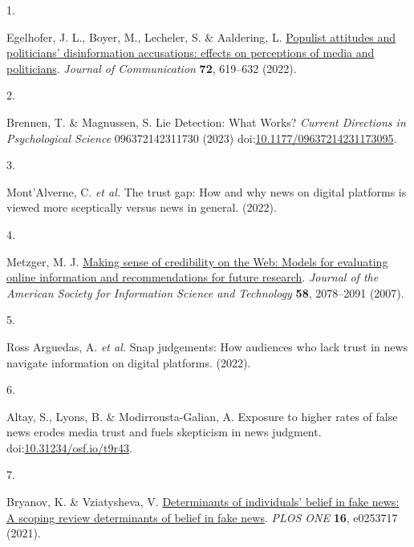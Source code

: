 \documentclass[
  doc,floatsintext]{apa6}
\newlength{\cslhangindent}
\newlength{\csllabelwidth}
\newenvironment{CSLReferences}[2] %
 {\begin{list}{}{%
  \setlength{\itemindent}{0pt}
  \setlength{\leftmargin}{0pt}
  \setlength{\parsep}{0pt}
  \ifodd #1
   \setlength{\leftmargin}{\cslhangindent}
   \setlength{\itemindent}{-1\cslhangindent}
  \fi
  \setlength{\itemsep}{#2\baselineskip}}}
 {\end{list}}
\newcommand{\CSLLeftMargin}[1]{\parbox[t]{\csllabelwidth}{\strut#1\strut}}
\newcommand{\CSLRightInline}[1]{\parbox[t]{\linewidth - \csllabelwidth}{\strut#1\strut}}
\begin{document}
\label{refs}
\begin{CSLReferences}{0}{0}
\CSLLeftMargin{1. }%
\CSLRightInline{Egelhofer, J. L., Boyer, M., Lecheler, S. \& Aaldering, L. \href{https://doi.org/10.1093/joc/jqac031}{Populist attitudes and politicians{'} disinformation accusations: effects on perceptions of media and politicians}. \emph{Journal of Communication} \textbf{72}, 619--632 (2022).}

\CSLLeftMargin{2. }%
\CSLRightInline{Brennen, T. \& Magnussen, S. Lie Detection: What Works? \emph{Current Directions in Psychological Science} 096372142311730 (2023) doi:\href{https://doi.org/10.1177/09637214231173095}{10.1177/09637214231173095}.}

\CSLLeftMargin{3. }%
\CSLRightInline{Mont'Alverne, C. \emph{et al.} The trust gap: How and why news on digital platforms is viewed more sceptically versus news in general. (2022).}

\CSLLeftMargin{4. }%
\CSLRightInline{Metzger, M. J. \href{https://doi.org/10.1002/asi.20672}{Making sense of credibility on the Web: Models for evaluating online information and recommendations for future research}. \emph{Journal of the American Society for Information Science and Technology} \textbf{58}, 2078--2091 (2007).}

\CSLLeftMargin{5. }%
\CSLRightInline{Ross Arguedas, A. \emph{et al.} Snap judgements: How audiences who lack trust in news navigate information on digital platforms. (2022).}

\CSLLeftMargin{6. }%
\CSLRightInline{Altay, S., Lyons, B. \& Modirrousta-Galian, A. Exposure to higher rates of false news erodes media trust and fuels skepticism in news judgment. doi:\href{https://doi.org/10.31234/osf.io/t9r43}{10.31234/osf.io/t9r43}.}

\CSLLeftMargin{7. }%
\CSLRightInline{Bryanov, K. \& Vziatysheva, V. \href{https://doi.org/10.1371/journal.pone.0253717}{Determinants of individuals{'} belief in fake news: A scoping review determinants of belief in fake news}. \emph{PLOS ONE} \textbf{16}, e0253717 (2021).}


\end{CSLReferences}
\end{document}

